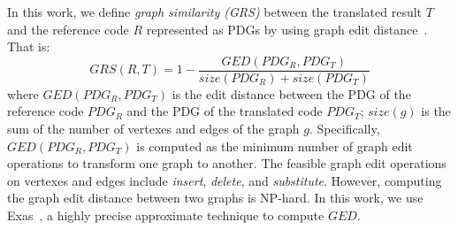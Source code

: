 In this work, we define \textit{graph similarity (GRS)} between the
translated result $T$ and the reference code $R$ represented as PDGs
by using graph edit distance~\cite{sanfeliu}. That is:
$$GRS(R, T) = 1-\frac{GED(PDG_R, PDG_T)}{size(PDG_R)+ size(PDG_T)}$$ where $GED(PDG_R, PDG_T)$ is the edit distance
between the PDG of the reference code $PDG_R$ and the PDG of the
translated code $PDG_T$; $size(g)$ is the sum of the number of
vertexes and edges of the graph $g$. Specifically, $GED(PDG_R, PDG_T)$
is computed as the minimum number of graph edit operations to
transform one graph to another. The feasible graph edit operations on
vertexes and edges include {\em insert}, {\em delete}, and {\em
  substitute}.  However, computing the graph edit distance between two
graphs is NP-hard.  In this work, we use Exas~\cite{fase09}, a highly
precise approximate technique to compute $GED$.



